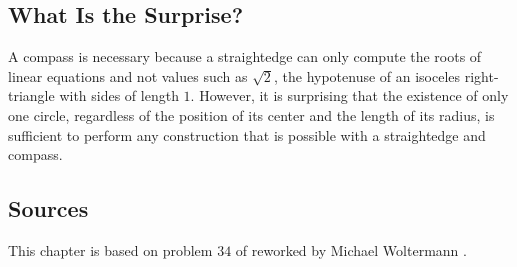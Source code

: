 \vspace{-3ex}

\subsection*{What Is the Surprise?}

A compass is necessary because a straightedge can only compute the roots of linear equations and not values such as $\sqrt{2}$, the hypotenuse of an isoceles right-triangle with sides of length $1$. However, it is surprising that the existence of only one circle, regardless of the position of its center and the length of its radius, is sufficient to perform any construction that is possible with a straightedge and compass.

\vspace{-3ex}

\subsection*{Sources}

This chapter is based on problem $34$ of \cite{dorrie1} reworked by Michael Woltermann \cite{dorrie2}.
